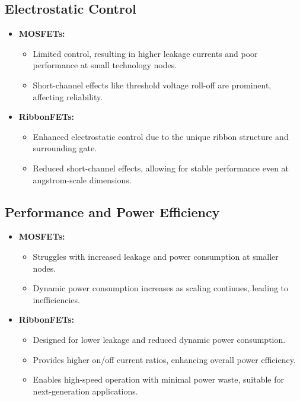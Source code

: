 \documentclass[12pt]{report}
\begin{document}
\begin{titlepage}
\subsection{Electrostatic Control}

\begin{itemize}
    \item \textbf{MOSFETs:} 
    \begin{itemize}
        \item Limited control, resulting in higher leakage currents and poor performance at small technology nodes.
        \item Short-channel effects like threshold voltage roll-off are prominent, affecting reliability.
    \end{itemize}
    
    \item \textbf{RibbonFETs:} 
    \begin{itemize}
        \item Enhanced electrostatic control due to the unique ribbon structure and surrounding gate.
        \item Reduced short-channel effects, allowing for stable performance even at angstrom-scale dimensions.
    \end{itemize}
\end{itemize}

\subsection{Performance and Power Efficiency}

\begin{itemize}
    \item \textbf{MOSFETs:} 
    \begin{itemize}
        \item Struggles with increased leakage and power consumption at smaller nodes.
        \item Dynamic power consumption increases as scaling continues, leading to inefficiencies.
    \end{itemize}
    
    \item \textbf{RibbonFETs:} 
    \begin{itemize}
        \item Designed for lower leakage and reduced dynamic power consumption.
        \item Provides higher on/off current ratios, enhancing overall power efficiency.
        \item Enables high-speed operation with minimal power waste, suitable for next-generation applications.
    \end{itemize}
\end{itemize}


\end{titlepage}
\end{document}
